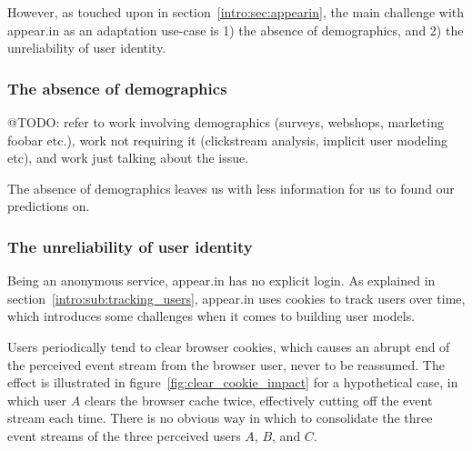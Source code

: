 However, as touched upon in section~\ref{intro:sec:appearin}, the main challenge with appear.in as an adaptation use-case is 1) the absence of demographics, and 2) the unreliability of user identity.

\subsubsection{The absence of demographics}

@TODO: refer to work involving demographics (surveys, webshops, marketing foobar etc.), work not requiring it (clickstream analysis, implicit user modeling etc), and work just talking about the issue.

The absence of demographics leaves us with less information for us to found our predictions on.

\subsubsection{The unreliability of user identity}
\label{survey:unreliable_identity}

Being an anonymous service, appear.in has no explicit login. As explained in section~\ref{intro:sub:tracking_users}, appear.in uses cookies to track users over time, which introduces some challenges when it comes to building user models.

Users periodically tend to clear browser cookies, which causes an abrupt end of the perceived event stream from the browser user, never to be reassumed. The effect is illustrated in figure~\ref{fig:clear_cookie_impact} for a hypothetical case, in which user $A$ clears the browser cache twice, effectively cutting off the event stream each time. There is no obvious way in which to consolidate the three event streams of the three perceived users $A$, $B$, and $C$.

